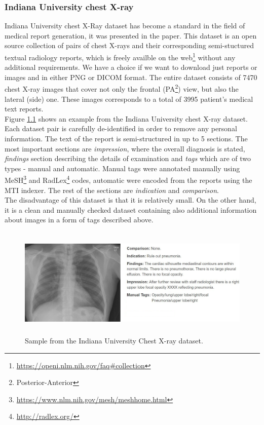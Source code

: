 \subsubsection{Indiana University chest X-ray}
Indiana University chest X-Ray dataset has become a standard in the field of medical report generation, it was presented in the \citet{10.1093/jamia/ocv080} paper. This dataset is an open source collection of pairs of chest X-rays and their corresponding semi-stuctured textual radiology reports, which is freely availble on the web\footnote[1]{\url{https://openi.nlm.nih.gov/faq\#collection}} without any additional requirements. We have a choice if we want to download just reports or images and in either PNG or DICOM format. The entire dataset consists of 7470 chest X-ray images that cover not only the frontal (PA\footnote[1]{Posterior-Anterior}) view, but also the lateral (side) one. These images corresponds to a total of 3995 patient's medical text reports.\\

Figure \hyperref[fig01:IUChestXRaySample]{1.1} shows an example from the Indiana University chest X-ray dataset. Each dataset pair is carefully de-identified in order to remove any personal information. The text of the report is semi-structured in up to 5 sections. The most important sections are \textit{impression}, where the overall diagnosis is stated, \textit{findings} section describing the details of examination and \textit{tags} which are of two types - manual and automatic. Manual tags were annotated manually using MeSH\footnote[1]{\url{https://www.nlm.nih.gov/mesh/meshhome.html}} and RadLex\footnote[1]{\url{http://radlex.org/}} codes, automatic were encoded from the reports using the MTI indexer. The rest of the sections are \textit{indication} and \textit{comparison}.\\

The disadvantage of this dataset is that it is relatively small. On the other hand, it is a clean and manually checked dataset containing also additional information about images in a form of tags described above.

\begin{figure}[h]\centering
\includegraphics[width=145mm, height=53mm]{../img/IUChestXRaySample_CXR1728_IM-0479-1001}
\caption{Sample from the Indiana University Chest X-ray dataset.}
\label{fig01:IUChestXRaySample}
\end{figure}

